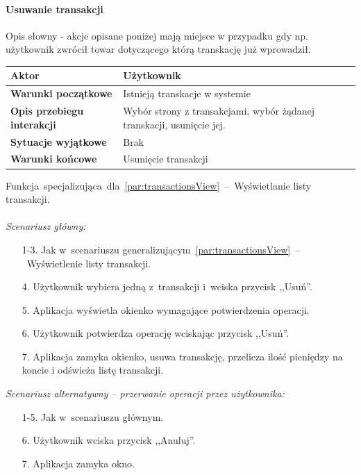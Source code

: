 \paragraph{Usuwanie transakcji\newline}
\label{par:transactionDelete}
Opis słowny - akcje opisane poniżej mają miejsce w przypadku gdy np. użytkownik zwrócił
towar dotyczącego którą transkację już wprowadził.
\begin{longtable}{|p{5cm}|p{7cm}|}
 	\hline
	\textbf{Aktor} & Użytkownik \\
	\hline
	\textbf{Warunki początkowe} & Istnieją transkacje w systemie
	\\
	\hline
	\textbf{Opis przebiegu interakcji} & Wybór strony z transakcjami, wybór żądanej transkacji,
	usunięcie jej.
	\\
	\hline
	\textbf{Sytuacje wyjątkowe} & Brak
	\\
	\hline
	\textbf{Warunki końcowe} & Usunięcie transakcji
	\\
	\hline
 \end{longtable}
Funkcja~specjalizująca~dla~\ref{par:transactionsView}~--~Wyświetlanie listy transakcji.\\\\
\textit{Scenariusz główny:}
\begin{enumerate}
  \item[1-3.] Jak w~scenariuszu generalizującym~\ref{par:transactionsView}~--~Wyświetlenie listy transakcji.
  \item[4.] Użytkownik wybiera jedną z~transakcji i~wciska przycisk ,,Usuń''.
  \item[5.] Aplikacja wyświetla okienko wymagające potwierdzenia operacji.
  \item[6.] Użytkownik potwierdza operację wciskając przycisk ,,Usuń''.
  \item[7.] Aplikacja zamyka okienko, usuwa transakcję, przelicza ilość pieniędzy na koncie i odświeża listę transakcji.
\end{enumerate}
\textit{Scenariusz alternatywny -- przerwanie operacji przez użytkownika:}
\begin{enumerate}
  \item[1-5.] Jak w~scenariuszu głównym.
  \item[6.] Użytkownik wciska przycisk ,,Anuluj''.
  \item[7.] Aplikacja zamyka okno.
\end{enumerate}

